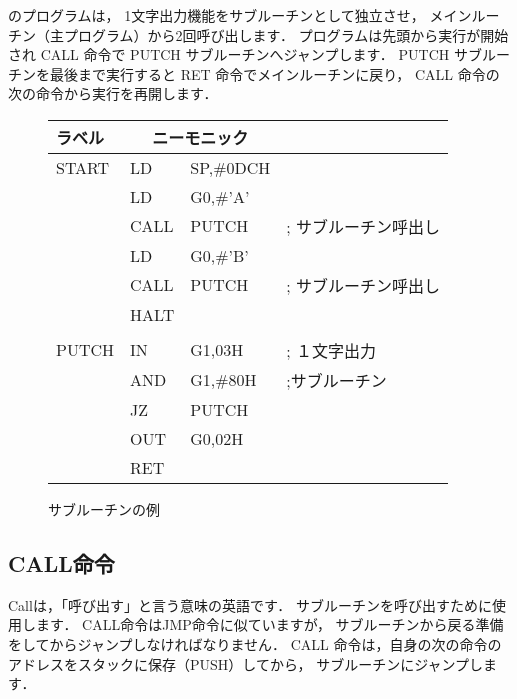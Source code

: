 のプログラムは，
1文字出力機能をサブルーチンとして独立させ，
メインルーチン（主プログラム）から2回呼び出します．
プログラムは先頭から実行が開始され
CALL 命令で PUTCH サブルーチンへジャンプします．
PUTCH サブルーチンを最後まで実行すると
RET 命令でメインルーチンに戻り，
CALL 命令の次の命令から実行を再開します．

\begin{figure}[bt]
{\tt\small\begin{center}
\begin{tabular}{|l|l l l|}
\hline
ラベル & \multicolumn{2}{|c}{ニーモニック} & \\\hline
START & LD   & SP,\#0DCH  &                      \\
      & LD   & G0,\#'A'   &                      \\
      & CALL & PUTCH      & ; サブルーチン呼出し \\
      & LD   & G0,\#'B'   &                      \\
      & CALL & PUTCH      & ; サブルーチン呼出し \\
      & HALT &            &                      \\
      &      &            &                      \\
PUTCH & IN   & G1,03H     & ; １文字出力         \\
      & AND  & G1,\#80H   & ;サブルーチン        \\
      & JZ   & PUTCH      &                      \\
      & OUT  & G0,02H     &                      \\
      & RET  &            &                      \\\hline
\end{tabular}
\end{center}}
\caption{サブルーチンの例}
\label{fig:chap6:sub}
\end{figure}

\subsection{CALL命令}

Callは，「呼び出す」と言う意味の英語です．
サブルーチンを呼び出すために使用します．
CALL命令はJMP命令に似ていますが，
サブルーチンから戻る準備をしてからジャンプしなければなりません．
CALL 命令は，自身の次の命令のアドレスをスタックに保存（PUSH）してから，
サブルーチンにジャンプします．

